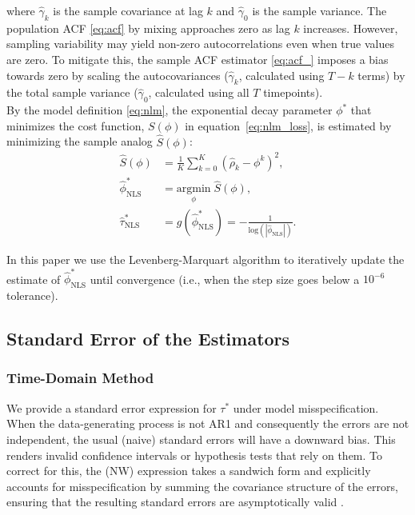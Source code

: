 \documentclass[docs/main.tex]{subfiles}
\begin{document}
\noindent where $\hat\gamma_k$ is the sample covariance at lag $k$ and $\hat\gamma_0$ is the sample variance. The population ACF \eqref{eq:acf} by mixing approaches zero as lag $k$ increases. However, sampling variability may yield non-zero autocorrelations even when true values are zero. To mitigate this, the sample ACF estimator \eqref{eq:acf_} imposes a bias towards zero by scaling the autocovariances ($\hat \gamma_k$, calculated using $T-k$ terms) by the total sample variance ($\hat\gamma_0$, calculated using all $T$ timepoints). \\

By the model definition \eqref{eq:nlm}, the exponential decay parameter $\phi^*$ that minimizes the cost function, $S(\phi)$ in equation~\eqref{eq:nlm_loss}, is estimated by minimizing the sample analog $\widehat{S}(\phi)$:
\begin{align}
    \widehat{S}(\phi) &= \frac{1}{K} \sum_{k=0}^K (\hat\rho_k - \phi^k)^2, \label{eq:nls_loss_}\\
    \hat \phi^*_{\scriptscriptstyle\text{NLS}} &= \underset{\phi}{\text{argmin}} \; \widehat{S}(\phi), \label{eq:nls_phi_}\\
    \hat \tau^*_{\scriptscriptstyle\text{NLS}} &= g(\hat \phi^*_{\scriptscriptstyle\text{NLS}}) = -\frac{1}{\text{log}(|\hat\phi_{\scriptscriptstyle\text{NLS}}|)}.
\end{align}

\noindent In this paper we use the Levenberg-Marquart algorithm to iteratively update the estimate of $\hat \phi^*_{\scriptscriptstyle\text{NLS}}$ until convergence (i.e., when the step size goes below a $10^{-6}$ tolerance).\\

\subsection{Standard Error of the Estimators}
\subsubsection{Time-Domain Method}\label{sec:stderr-time-domain}
We provide a standard error expression for $\tau^*$ under model misspecification. When the data-generating process is not AR1 and consequently the errors are not independent, the usual (naive) standard errors will have a downward bias. This renders invalid confidence intervals or hypothesis tests that rely on them. To correct for this, the \citet{newey_simple_1987} (NW) expression takes a sandwich form and explicitly accounts for misspecification by summing the covariance structure of the errors, ensuring that the resulting standard errors are asymptotically valid \citep[Theorem 14.32]{hansen_econometrics_2022}.\\
\end{document}
